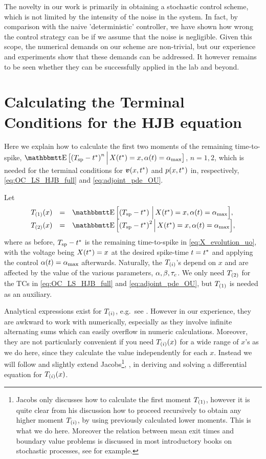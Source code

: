 \documentclass[12pt]{iopart}
\begin{document}
The novelty in our work is primarily in obtaining a stochastic control scheme,
which is not limited by the intensity of the noise in the system. In fact, by
comparison with the naive 'deterministic' controller, we have shown how wrong
the control strategy can be if we assume that the noise is negligible. Given
this scope, the numerical demands on our scheme are non-trivial, but our
experience and experiments show that these demands can be addressed.
It however remains to be seen whether they can be successfully applied in the lab
and beyond.


\appendix
\section{Calculating the Terminal Conditions for the HJB equation}
\label{sec:valuefun_TCs}
Here we explain how to calculate the first two moments of the remaining
time-to-spike, $\Exp \big[\trem^n \,\Big|\, X(\T) = x, \a(t) = \amax
\big]$, $n=1,2$, which is needed for the terminal conditions for ${ \boldsymbol{v} }(x,{ t^* })$
and $p(x,{ t^* })$ in, respectively, \cref{eq:OC_LS_HJB_full} and
\cref{eq:adjoint_pde_OU}.

Let
\begin{equation}
\begin{array}{lcl}
\Tone(x) &=& \Exp \Big[\trem \,\,\Big|\, X(\T) = x, \a(t) = \amax
\Big],
\\
\Ttwo(x) &=&
\Exp \Big[\trem^2 \,\Big|\, X(\T) = x, \a(t) = \amax \Big],
\end{array}
\end{equation}
where as before, ${ T_{\textrm{sp} } }-{ t^* }$ is the remaining time-to-spike in
\cref{eq:X_evolution_uo}, with the voltage being $X({ t^* }) = x$ at the desired
spike-time $t={ t^* }$ and applying the control ${\alpha}(t) = { {\alpha}_{\textrm{max}} }$ afterwards.
Naturally, the ${ {T}_{(i)} }$'s depend on $x$ and are affected by the value of the
various parameters, ${\alpha},{\beta},{ \tau_{c} }$. We only  need ${ {T}_{(2)} }$ for the TCs in
\cref{eq:OC_LS_HJB_full} and \cref{eq:adjoint_pde_OU}, but ${ {T}_{(1)} }$ is needed as
an auxiliary. 
  
Analytical expressions exist for ${ {T}_{(i)} }$, e.g.\ see \cite{Inoue1995}.
However in our experience, they are awkward to work with numerically, especially
as they involve infinite alternating sums which can easily overflow in numeric
calculations. Moreover, they are not particularly convenient if you need ${ {T}_{(i)} }
(x)$ for a wide range of $x$'s as we do here, since they calculate the value
independently for each $x$. Instead we will follow and slightly extend Jacobs\footnote{Jacobs only discusses how to calculate the first moment
${ {T}_{(1)} }$, however it is quite clear from his discussion how to proceed
recursively to obtain any higher moment ${ {T}_{(i)} }$, by using previously calculated
lower moments. This is what we do here. Moreover the relation between mean exit
times and boundary value problems is discussed in most
introductory books on stochastic processes, see \cite{Oksendal2007} for
example.}, \cite{Jacobs}, in deriving and solving a differential equation for
${ {T}_{(i)} }(x)$.
\end{document}
